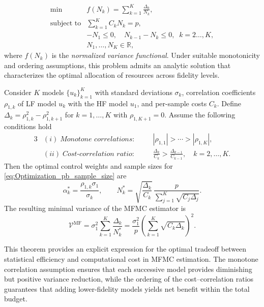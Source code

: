 %
\begin{equation}\label{eq:Optimization_pb_sample_size_reduced}
    \begin{array}{ll}
    \min &\displaystyle f(N_k) =\sum_{k=1}^K \frac{\Delta_k}{N_k},\\
       \text{subject to} &\displaystyle\sum\limits_{k=1}^K C_kN_k=p,\\[2pt]
       &\displaystyle -N_1\le 0,\quad \displaystyle N_{k-1}-N_k\le 0, \;\; k=2\ldots,K,\\
       &N_1,\ldots, N_K\in \mathbb{R},
    \end{array}
\end{equation}
%
where $f(N_k)$ is the {\it normalized variance functional}. Under suitable monotonicity and ordering assumptions, this problem admits an analytic solution that characterizes the optimal allocation of resources across fidelity levels. 


%
\begin{theorem}\label{thm:Sample_size_est}
Consider $K$ models $\{u_{k}\}_{k=1}^K$ with standard deviations $\sigma_k$, correlation coefficients $\rho_{1,k}$ of LF model $u_k$ with the HF model $u_1$, and per-sample costs $C_k$. Define $\Delta_k = \rho_{1,k}^2 - \rho_{1,k+1}^2$ for $k = 1, \dots, K$ with $\rho_{1,K+1}=0$. Assume the following conditions hold
%
\begin{alignat*}{3}
&(i)\;\textit{Monotone correlations:} &\quad& |\rho_{1,1}| > \cdots > |\rho_{1,K}|,\\
&(ii)\;\textit{Cost-correlation ratio:} &\quad& \frac{\Delta_{k}}{C_k} > \frac{\Delta_{k-1}}{C_{k-1}}, \quad k=2,\ldots,K.
\end{alignat*}
%
Then the optimal control weights and sample sizes for \eqref{eq:Optimization_pb_sample_size} are
%
\begin{equation}\label{eq:MFMC_RealValued_Sample_Size}
    \alpha_k^* = \frac{\rho_{1,k}\sigma_1}{\sigma_k}, \qquad
    N_k^* = \sqrt{\frac{\Delta_k}{C_k}}\,
    \frac{p}{\sum_{j=1}^K \sqrt{C_j \Delta_j}}.
\end{equation}
%
%
The resulting minimal variance of the MFMC estimator is
\begin{equation}\label{eq:MFMC_variance_optimal}
\mathcal{V}^{\text{MF}}
= \sigma_1^2\sum_{k=1}^K \frac{\Delta_k}{N_k^*}=\frac{\sigma_1^2}{p}\!\left(\sum_{k=1}^K \sqrt{C_k \Delta_k}\right)^{\!2}.
\end{equation}
\end{theorem}
%
This theorem provides an explicit expression for the optimal tradeoff between statistical efficiency and computational cost in MFMC estimation. The monotone correlation assumption ensures that each successive model provides diminishing but positive variance reduction, while the ordering of the cost–correlation ratios guarantees that adding lower-fidelity models yields net benefit within the total budget. 

